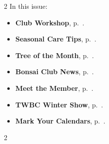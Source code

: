 \setlength{\columnsep}{-5.0cm}
\begin{multicols}{2}
    \noindent\textsf{In this issue:}
    \begin{itemize}
        \item \textsf{\textbf{Club Workshop}}, p.~\pageref{2025-01-potting}.
        \item \textsf{\textbf{Seasonal Care Tips}}, p.~\pageref{2025-01-care}.
        \item \textsf{\textbf{Tree of the Month}}, p.~\pageref{2025-01-contest}.
        \item \textsf{\textbf{Bonsai Club News}}, p.~\pageref{2025-01-news}.
        \item \textsf{\textbf{Meet the Member}}, p.~\pageref{2025-01-roots}.
        \item \textsf{\textbf{TWBC Winter Show}}, p.~\pageref{2025-01-winter}.
        \item \textsf{\textbf{Mark Your Calendars}}, p.~\pageref{2025-01-events}.
    \end{itemize}
    \vfill\null
    \columnbreak

    
\end{multicols}
\pagebreak

\setlength{\columnsep}{0.5cm}
\begin{multicols}{2}
    
    
    
    
    
    
    
\end{multicols}
